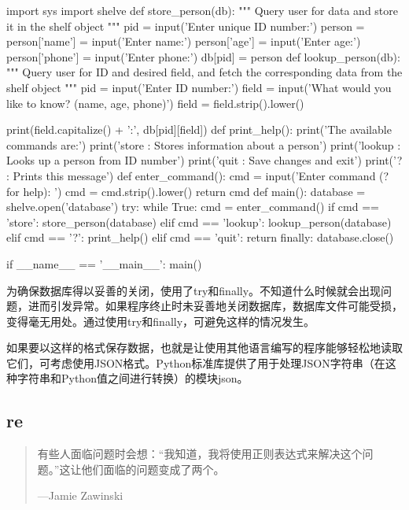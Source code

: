\begin{pyc}
import sys
import shelve
def store_person(db):
    """
    Query user  for data and store it in the shelf object
    """
    pid = input('Enter unique ID number:')
    person = {}
    person['name'] = input('Enter name:')
    person['age'] = input('Enter age:')
    person['phone'] = input('Enter phone:')
    db[pid] = person
def lookup_person(db):
    """
    Query user for ID and desired field, and fetch the corresponding data from the shelf object
    """
    pid = input('Enter ID number:')
    field = input('What would you like to know? (name, age, phone)')
    field = field.strip().lower()

    print(field.capitalize() + ':', db[pid][field])
def print_help():
    print('The available commands are:')
    print('store : Stores information about a person')
    print('lookup : Looks up a person from ID number')
    print('quit : Save changes and exit')
    print('? : Prints this message')
def enter_command():
    cmd = input('Enter command (? for help): ')
    cmd = cmd.strip().lower()
    return cmd
def main():
    database = shelve.open('database')
    try:
        while True:
            cmd = enter_command()
            if cmd == 'store':
                store_person(database)
            elif cmd == 'lookup':
                lookup_person(database)
            elif cmd == '?':
                print_help()
            elif cmd == 'quit':
                return
    finally:
        database.close()

if __name__ == '__main__':
    main()
\end{pyc}

为确保数据库得以妥善的关闭，使用了try和finally。不知道什么时候就会出现问题，进而引发异常。如果程序终止时未妥善地关闭数据库，数据库文件可能受损，变得毫无用处。通过使用try和finally，可避免这样的情况发生。

\begin{tcolorbox}[breakable]
如果要以这样的格式保存数据，也就是让使用其他语言编写的程序能够轻松地读取它们，可考虑使用JSON格式。Python标准库提供了用于处理JSON字符串（在这种字符串和Python值之间进行转换）的模块json。
\end{tcolorbox}
\subsection{re}
\begin{quotation}
有些人面临问题时会想：“我知道，我将使用正则表达式来解决这个问题。”这让他们面临的问题变成了两个。
\begin{flushright}
---Jamie Zawinski
\end{flushright}
\end{quotation}

